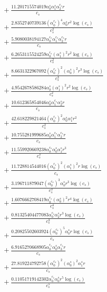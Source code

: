 \documentclass[10pt]{article}
\begin{document}
\begin{align*}
&{}  + \frac{11.201715574019 \alpha_{0}^s \alpha_{1}^s \alpha_{2}^{c_s} r}{c_{s}} \\
&{}  + \frac{2.8352740739136 \left(\alpha_{0}^{c_s}\right)^{4} \alpha_{0}^s r^{2} \log{\left(c_{s} \right)}}{c_{s}^{2}} \\
&{}  + \frac{5.9080038194127 \alpha_{0}^{c_s} \alpha_{1}^{c_s} \alpha_{2}^{c_s} r}{c_{s}} \\
&{}  + \frac{6.2653115524259 \alpha_{0}^{c_s} \left(\alpha_{1}^s\right)^{2} r^{2} \log{\left(c_{s} \right)}}{c_{s}^{2}} \\
&{}  + \frac{8.6631322967092 \left(\alpha_{0}^{c_s}\right)^{2} \left(\alpha_{0}^s\right)^{2} r^{3} \log{\left(c_{s} \right)}}{c_{s}^{3}} \\
&{}  + \frac{4.9542678586284 \alpha_{0}^s \left(\alpha_{1}^s\right)^{2} r^{2} \log{\left(c_{s} \right)}}{c_{s}^{2}} \\
&{}  + \frac{10.612365854046 \alpha_{0}^s \alpha_{1}^{c_s} \alpha_{2}^s r}{c_{s}} \\
&{}  + \frac{42.618229821464 \left(\alpha_{0}^{c_s}\right)^{2} \alpha_{0}^s \alpha_{1}^s r^{2}}{c_{s}^{2}} \\
&{}  + \frac{10.755281999685 \alpha_{0}^s \alpha_{1}^{c_s} \alpha_{2}^{c_s} r}{c_{s}} \\
&{}  + \frac{11.559920669238 \alpha_{0}^{c_s} \alpha_{0}^s \alpha_{1}^s r^{3}}{c_{s}^{3}} \\
&{}  + \frac{11.728814544016 \left(\alpha_{0}^{c_s}\right)^{2} \left(\alpha_{1}^s\right)^{2} r \log{\left(c_{s} \right)}}{c_{s}} \\
&{}  + \frac{3.196711879047 \left(\alpha_{0}^{c_s}\right)^{3} \alpha_{0}^s r^{3} \log{\left(c_{s} \right)}}{c_{s}^{3}} \\
&{}  + \frac{1.6076662708419 \alpha_{0}^{c_s} \left(\alpha_{0}^s\right)^{2} r^{4} \log{\left(c_{s} \right)}}{c_{s}^{4}} \\
&{}  + \frac{0.81325404477083 \alpha_{0}^{c_s} \alpha_{2}^s r^{3} \log{\left(c_{s} \right)}}{c_{s}^{3}} \\
&{}  + \frac{0.20825502603924 \left(\alpha_{0}^{c_s}\right)^{5} \alpha_{0}^s r \log{\left(c_{s} \right)}}{c_{s}} \\
&{}  + \frac{6.9165270668905 \alpha_{0}^{c_s} \alpha_{0}^s \alpha_{3}^{c_s} r}{c_{s}} \\
&{}  + \frac{27.819224792758 \left(\alpha_{0}^{c_s}\right)^{2} \left(\alpha_{0}^s\right)^{2} \alpha_{1}^s r}{c_{s}} \\
&{}  + \frac{0.11051719142302 \alpha_{0}^{c_s} \alpha_{0}^s r^{5} \log{\left(c_{s} \right)}}{c_{s}^{5}} \\

\end{align*}
\end{document}
